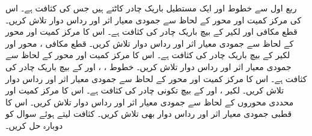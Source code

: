 ربع اول سے خطوط  اور  ایک مستطیل  باریک چادر کاٹتے ہیں جس کی کثافت  ہے۔ اس کی مرکز کمیت اور محور  کے لحاظ سے جمودی معیار اثر  اور رداس دوار تلاش کریں۔
قطع مکافی  اور لکیر  کے بیچ باریک چادر کی کثافت  ہے۔ اس کا مرکز کمیت اور محور  کے لحاظ سے جمودی معیار اثر اور رداس  دوار تلاش کریں۔
قطع مکافی ، محور  اور  لکیر  کے بیچ باریک چادر کی کثافت  ہے۔ اس کا مرکز کمیت اور محور  کے لحاظ سے جمودی معیار اثر اور رداس  دوار تلاش کریں۔
خطوط  ،   ،  اور   کے بیچ باریک چادر کی کثافت  ہے۔ اس کا مرکز کمیت اور محور  کے لحاظ سے جمودی معیار اثر اور رداس  دوار تلاش کریں۔
لکیر ،  اور  کے بیچ تکونی چادر کی کثافت  ہے۔ اس کا مرکز کمیت  اور محددی محوروں کے لحاظ سے جمودی معیار اثر اور رداس دوار تلاش کریں۔ اس کا قطبی جمودی معیار اثر اور  رداس دوار بھی تلاش کریں۔
کثافت  لیتے ہوئے سوال  کو دوبارہ حل کریں۔

